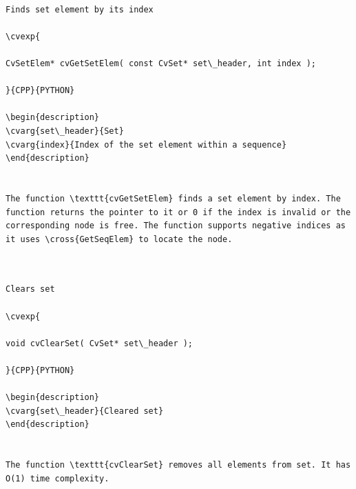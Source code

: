\label{GetSetElem}
\begin{verbatim}

Finds set element by its index

\cvexp{

CvSetElem* cvGetSetElem( const CvSet* set\_header, int index );

}{CPP}{PYTHON}

\begin{description}
\cvarg{set\_header}{Set}
\cvarg{index}{Index of the set element within a sequence}
\end{description}


The function \texttt{cvGetSetElem} finds a set element by index. The function returns the pointer to it or 0 if the index is invalid or the corresponding node is free. The function supports negative indices as it uses \cross{GetSeqElem} to locate the node.


\end{verbatim}
\label{ClearSet}
\begin{verbatim}

Clears set

\cvexp{

void cvClearSet( CvSet* set\_header );

}{CPP}{PYTHON}

\begin{description}
\cvarg{set\_header}{Cleared set}
\end{description}


The function \texttt{cvClearSet} removes all elements from set. It has O(1) time complexity.


\end{verbatim}
